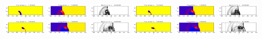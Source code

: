 \documentclass[11pt]{article}
\begin{document}
\includegraphics[width=0.15833333333333333\textwidth]{frame0003fig1.png}
\includegraphics[width=0.15833333333333333\textwidth]{frame0003fig2.png}
\vskip 10pt 
\includegraphics[width=0.15833333333333333\textwidth]{frame0004fig0.png}
\includegraphics[width=0.15833333333333333\textwidth]{frame0004fig1.png}
\includegraphics[width=0.15833333333333333\textwidth]{frame0004fig2.png}
\includegraphics[width=0.15833333333333333\textwidth]{frame0005fig0.png}
\includegraphics[width=0.15833333333333333\textwidth]{frame0005fig1.png}
\includegraphics[width=0.15833333333333333\textwidth]{frame0005fig2.png}
\vskip 10pt 
\includegraphics[width=0.15833333333333333\textwidth]{frame0006fig0.png}
\includegraphics[width=0.15833333333333333\textwidth]{frame0006fig1.png}
\includegraphics[width=0.15833333333333333\textwidth]{frame0006fig2.png}
\includegraphics[width=0.15833333333333333\textwidth]{frame0007fig0.png}
\end{document}

